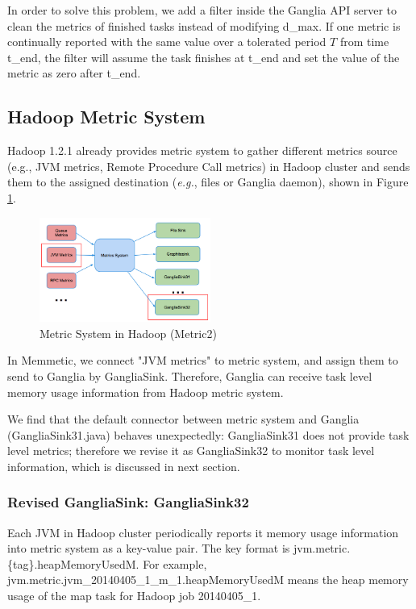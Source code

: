 In order to solve this problem, we add a filter inside the Ganglia API server to clean the metrics of finished tasks instead of modifying d\_max. If one metric is continually reported with the same value over a tolerated period $T$ from time t\_end, the filter will assume the task finishes at t\_end and set the value of the metric as zero after t\_end. 

\subsection{Hadoop Metric System}

Hadoop 1.2.1 already provides metric system to gather different metrics source (e.g., JVM metrics, Remote Procedure Call metrics) in Hadoop cluster and sends them to the assigned destination (\emph{e.g.}, files or Ganglia daemon), shown in Figure \ref{fig:metric2}.

\begin{figure}[h!]
  \centering
    \includegraphics[width=0.5\textwidth]{image/ganglia32}
  \caption{Metric System in Hadoop (Metric2)}
  \label{fig:metric2}
\end{figure}

In Memmetic, we connect "JVM metrics" to metric system, and assign them to send to Ganglia by GangliaSink. Therefore, Ganglia can receive task level memory usage information from Hadoop metric system.

We find that the default connector between metric system and Ganglia (GangliaSink31.java) behaves unexpectedly: GangliaSink31 does not provide task level metrics; therefore we revise it as GangliaSink32 to monitor task level information, which is discussed in next section.

\subsubsection{Revised GangliaSink: GangliaSink32}

Each JVM in Hadoop cluster periodically reports it memory usage information into metric system as a key-value pair. The key format is jvm.metric.\{tag\}.heapMemoryUsedM. For example, jvm.metric.jvm\_20140405\_1\_m\_1.heapMemoryUsedM means the heap memory usage of the map task for Hadoop job 20140405\_1. 

